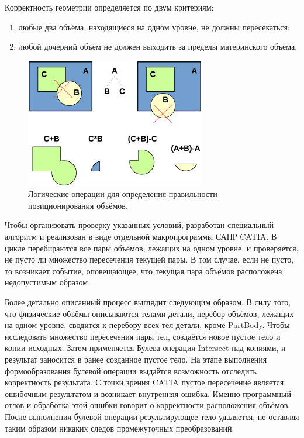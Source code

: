 Корректность геометрии определяется по двум критериям:
\begin{enumerate}
\item любые два объёма, находящиеся на одном уровне, не должны пересекаться;
\item любой дочерний объём не должен выходить за пределы материнского объёма.
\end{enumerate}

\begin{figure}[H]
\centering
\includegraphics[width=0.7\textwidth]{pictures/Checker.eps}
\caption{Логические операции для определения правильности позиционирования объёмов.}
\label{fig:CheckerOperations}
\end{figure}

Чтобы организовать проверку указанных условий, разработан специальный алгоритм и реализован в виде отдельной макропрограммы  САПР CATIA. В цикле перебираются все пары объёмов, лежащих на одном уровне, и проверяется, не пусто ли множество пересечения текущей пары. В том случае, если не пусто, то возникает событие, оповещающее, что текущая пара объёмов расположена недопустимым образом.

Более детально описанный процесс выглядит следующим образом. В силу того, что физические объёмы описываются телами детали, перебор объёмов, лежащих на одном уровне, сводится к перебору всех тел детали, кроме PartBody. Чтобы исследовать множество пересечения пары тел, создаётся новое пустое тело и копии исходных. Затем применяется Булева операция Intersect над копиями, и результат заносится в ранее созданное пустое тело. На этапе выполнения формообразования булевой операции выдаётся возможность отследить корректность результата. С точки зрения CATIA пустое пересечение является ошибочным результатом и возникает внутренняя ошибка. Именно программный отлов и обработка этой ошибки говорит о корректности расположения объёмов. После выполнения булевой операции результирующее тело удаляется, не оставляя таким образом никаких следов промежуточных преобразований.


